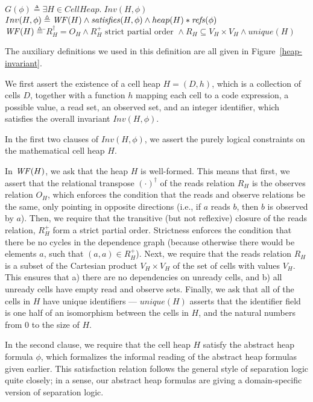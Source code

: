 \begin{tabbing}
    $G(\phi) \triangleq \exists H \in CellHeap.\; Inv(H, \phi)$ \\ [1em]

$Inv(H, \phi) \triangleq \mathit{WF}(H) \land \mathit{satisfies}({H}, {\phi}) \land heap(H) * \mathit{refs}(\phi)$ \\[1em]

$\mathit{WF}(H) \triangleq\;$\=$ R_H^\dagger = O_H \land R_H^+ \mbox{ strict partial order } \land R_H \subseteq V_H \times V_H \land unique(H)$ 
\end{tabbing}

The auxiliary definitions we used in this definition are all given in
Figure~\ref{heap-invariant}. 

We first assert the existence of a cell heap $H = (D,h)$, which is a
collection of cells $D$, together with a function $h$ mapping each
cell to a code expression, a possible value, a read set, an observed
set, and an integer identifier, which satisfies the overall invariant
$Inv(H, \phi)$.

In the first two clauses of $Inv(H, \phi)$, we assert the purely
logical constraints on the mathematical cell heap $H$. 

In $\mathit{WF}(H)$, we ask that the heap $H$ is well-formed. This means that
first, we assert that the relational transpose $(\cdot)^\dagger$ of
the reads relation $R_H$ is the observes relation $O_H$, which
enforces the condition that the reads and observe relations be the
same, only pointing in opposite directions (i.e., if $a$ reads $b$,
then $b$ is observed by $a$). Then, we require that the transitive
(but not reflexive) closure of the reads relation, $R^+_H$ form a
strict partial order. Strictness enforces the condition that there be
no cycles in the dependence graph (because otherwise there would be
elements $a$, such that $(a, a) \in R^+_H$).  Next, we require that
the reads relation $R_H$ is a subset of the Cartesian product $V_H
\times V_H$ of the set of cells with values $V_H$. This ensures that
a) there are no dependencies on unready cells, and b) all unready
cells have empty read and observe sets. Finally, we ask that all of
the cells in $H$ have unique identifiers --- $unique(H)$ asserts that
the identifier field is one half of an isomorphism between the cells
in $H$, and the natural numbers from 0 to the size of $H$.

In the second clause, we require that the cell heap $H$ satisfy the
abstract heap formula $\phi$, which formalizes the informal reading of
the abstract heap formulas given earlier. This satisfaction relation
follows the general style of separation logic quite closely; in a
sense, our abstract heap formulas are giving a domain-specific version
of separation logic.

